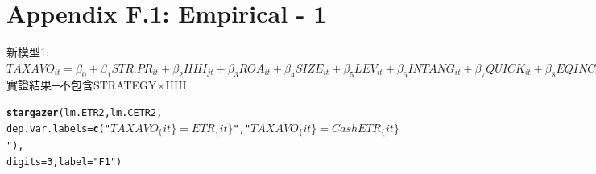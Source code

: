 \documentclass[a4paper]{article}\usepackage[]{graphicx}\usepackage[]{color}
\makeatletter
\newcommand{\hlnum}[1]{\textcolor[rgb]{0.686,0.059,0.569}{#1}}%
\newcommand{\hlstr}[1]{\textcolor[rgb]{0.192,0.494,0.8}{#1}}%
\newcommand{\hlstd}[1]{\textcolor[rgb]{0.345,0.345,0.345}{#1}}%
\newcommand{\hlkwc}[1]{\textcolor[rgb]{0.333,0.667,0.333}{#1}}%
\newcommand{\hlkwd}[1]{\textcolor[rgb]{0.737,0.353,0.396}{\textbf{#1}}}%
\newenvironment{kframe}{%
 \def\at@end@of@kframe{}%
 \ifinner\ifhmode%
  \def\at@end@of@kframe{\end{minipage}}%
  \begin{minipage}{\columnwidth}%
 \fi\fi%
 \def\FrameCommand##1{\hskip\@totalleftmargin \hskip-\fboxsep
 \colorbox{shadecolor}{##1}\hskip-\fboxsep
     \hskip-\linewidth \hskip-\@totalleftmargin \hskip\columnwidth}%
 \MakeFramed {\advance\hsize-\width
   \@totalleftmargin\z@ \linewidth\hsize
   \@setminipage}}%
 {\par\unskip\endMakeFramed%
 \at@end@of@kframe}
\makeatother
\begin{document}
\section{\\Appendix F.1: Empirical - 1} \label{App:Appendix F.1}
新模型1:\\
$TAXAVO_{it}=\beta_{0}+\beta_{1}STR.PR_{it}+\beta_{2}HHI_{jt}+\beta_{3}ROA_{it}+\beta_{4}SIZE_{it}+\beta_{5}LEV_{it}+\beta_{6}INTANG_{it}+\beta_{7}QUICK_{it}+\beta_{8}EQINC_{it}+\beta_{9}OUTINSTI_{it}+\beta_{10}RELAT_{it}+\beta_{11}FAMILY_{it}+\beta_{12}GDP_{it}+\varepsilon_{13}$\\
實證結果─不包含STRATEGY×HHI\\
\begin{kframe}
\begin{alltt}
  \hlkwd{stargazer}\hlstd{(lm.ETR2,lm.CETR2,}
    \hlkwc{dep.var.labels} \hlstd{=} \hlkwd{c}\hlstd{(}\hlstr{"$TAXAVO_\{it\}=ETR_\{it\}$"}\hlstd{,}\hlstr{"$TAXAVO_\{it\}=CashETR_\{it\}$"}\hlstd{),}
    \hlkwc{digits}\hlstd{=}\hlnum{3}\hlstd{,}\hlkwc{label} \hlstd{=} \hlstr{"F1"}\hlstd{)}
\end{alltt}
\end{kframe}
\end{document}

